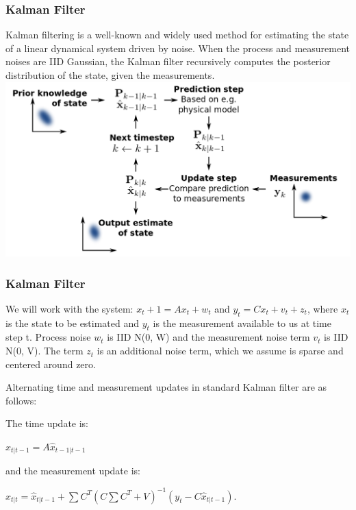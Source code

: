 \documentclass{beamer}
\begin{document}
\begin{frame}
\frametitle{Kalman Filter}
Kalman filtering is a well-known and widely used method for
estimating the state of a linear dynamical system driven by
noise. When the process and measurement noises are IID Gaussian, the Kalman filter recursively computes the posterior distribution of the state, given the measurements.
\includegraphics[scale=0.25]{Kalman.png}


\end{frame}
\begin{frame}
\frametitle{Kalman Filter}

We will work with the system:
        $x_t+1 = Ax_t + w_t$ and $y_t = Cx_t + v_t + z_t$,
where $x_{t}$ is the state to be estimated and $y_t$ is the measurement available to us at time step t. Process noise $w_t$ is IID N(0, W) and the measurement noise term $v_t$ is IID N(0, V). The term $z_t$ is an additional noise term, which we assume is sparse and centered around zero.



Alternating time and measurement updates in standard Kalman filter are as follows:

The time update is:\\
\begin{center}
            $\hat{x}_{t|t-1} = A\hat{x}_{t-1|t-1}$
\end{center}
    
and the measurement update is:\\
\begin{center}

    $\hat{x}_{t|t} = \hat{x}_{t|t-1} + \sum C^T(C\sum C^T + V)^{-1}(y_t - C\hat{x}_{t|t-1})$.
\end{center}
\end{frame}
\end{document}
